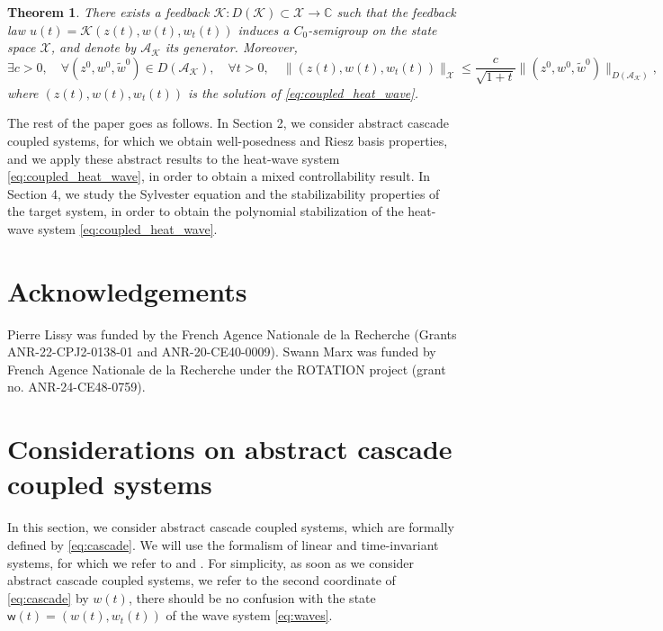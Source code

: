 \documentclass[10pt]{article}
\newtheorem{Theorem}{Theorem}[section]
\begin{document}
\begin{Theorem}\label{theo:stabl_heat_wave}
There exists a feedback $\mathcal{K} : D(\mathcal{K}) \subset \mathcal{X} \rightarrow \mathbb{C}$ such that the feedback law  $u(t) = \mathcal{K}(z(t),w(t),w_t(t))$ induces a $C_0$-semigroup on the state space $\mathcal{X}$, and denote by $\mathcal{A}_\mathcal{K}$ its generator. Moreover, 
\[
\exists c > 0,\quad \forall (z^0,w^0,\tilde{w}^0) \in D(\mathcal{A}_\mathcal{K}),\quad \forall t > 0,\quad \|(z(t),w(t),w_t(t))\|_\mathcal{X} \leq \frac{c}{\sqrt{1+t}} \|(z^0,w^0,\tilde{w}^0) \|_{D(\mathcal{A}_\mathcal{K})},
\]
where $(z(t),w(t),w_t(t))$ is the solution of \eqref{eq:coupled_heat_wave}. 
\end{Theorem}
The rest of the paper goes as follows. In Section 2, we consider abstract cascade coupled systems, for which we obtain well-posedness and Riesz basis properties, and we apply these abstract results to the heat-wave system \eqref{eq:coupled_heat_wave}, in order to obtain a mixed controllability result. In Section 4, we study the Sylvester equation and the stabilizability properties of the target system, in order to obtain the polynomial stabilization of the heat-wave system \eqref{eq:coupled_heat_wave}. 

\section*{Acknowledgements}
Pierre Lissy was funded by the French Agence Nationale de la Recherche (Grants ANR-22-CPJ2-0138-01 and ANR-20-CE40-0009). Swann Marx was funded by French Agence Nationale de la Recherche under the ROTATION project (grant no. ANR-24-CE48-0759).

\section{Considerations on abstract cascade coupled systems}
In this section, we consider abstract cascade coupled systems, which are formally defined by \eqref{eq:cascade}. We will use the formalism of linear and time-invariant systems, for which we refer to \cite{tucsnak2009observation,LTI} and \cite[\S 2.3]{Coron}. For simplicity, as soon as we consider abstract cascade coupled systems, we refer to the second coordinate of \eqref{eq:cascade} by $w(t)$, there should be no confusion with the state $\mathsf{w}(t) = (w(t),w_t(t))$ of the wave system \eqref{eq:waves}. 
\end{document}
